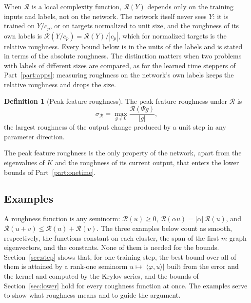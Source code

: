 \documentclass[11pt]{article}
\theoremstyle{definition}
\newtheorem{definition}{Definition}
\theoremstyle{remark}
\newcommand{\Rgh}{\mathcal{R}}           %
\newcommand{\sR}{\sigma_{\Rgh}}
\newcommand{\ip}[2]{\langle #1,#2\rangle}
\begin{document}
When $\Rgh$ is a local complexity function, $\Rgh(Y)$ depends only on the training inputs and labels, not on the network.
The network itself never sees $Y$: it is trained on $Y/c_p$, or on targets normalized to unit size, and the roughness of its own labels is $\Rgh(Y/c_p) = \Rgh(Y)/|c_p|$, which for normalized targets is the relative roughness.
Every bound below is in the units of the labels and is stated in terms of the absolute roughness.
The distinction matters when two problems with labels of different sizes are compared, as for the learned time steppers of Part~\ref{part:apps}: measuring roughness on the network's own labels keeps the relative roughness and drops the size.

\begin{definition}[Peak feature roughness]\label{def:sigma}
The peak feature roughness under $\Rgh$ is
\begin{equation}\label{eq:sigma}
\sR = \max_{g\neq 0}\frac{\Rgh(\Psi g)}{|g|},
\end{equation}
the largest roughness of the output change produced by a unit step in any parameter direction.
\end{definition}

The peak feature roughness is the only property of the network, apart from the eigenvalues of $K$ and the roughness of its current output, that enters the lower bounds of Part~\ref{part:onetime}.

\subsection{Examples}\label{sec:examples}

A roughness function is any seminorm: $\Rgh(u) \ge 0$, $\Rgh(\alpha u) = |\alpha|\,\Rgh(u)$, and $\Rgh(u+v) \le \Rgh(u) + \Rgh(v)$.
The three examples below count as smooth, respectively, the functions constant on each cluster, the span of the first $m$ graph eigenvectors, and the constants.
None of them is needed for the bounds.
Section~\ref{sec:step} shows that, for one training step, the best bound over all of them is attained by a rank-one seminorm $u \mapsto |\ip{\varphi}{u}|$ built from the error and the kernel and computed by the Krylov series, and the bounds of Section~\ref{sec:lower} hold for every roughness function at once.
The examples serve to show what roughness means and to guide the argument.
\end{document}
